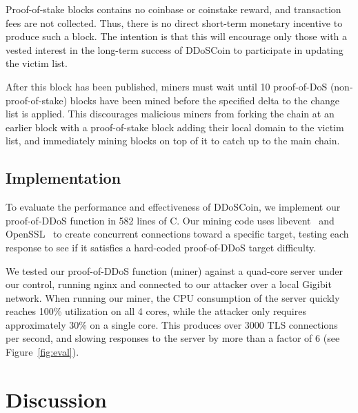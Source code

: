 Proof-of-stake blocks contains no coinbase or coinstake reward, and transaction
fees are not collected. Thus, there is no direct short-term monetary incentive
to produce such a block. The intention is that this will encourage only those
with a vested interest in the long-term success of DDoSCoin to participate in
updating the victim list.

After this block has been published, miners must wait until 10 proof-of-DoS
(non-proof-of-stake) blocks have been mined before the specified delta to the
change list is applied. This discourages malicious miners from forking the chain
at an earlier block with a proof-of-stake block adding their local domain to the
victim list, and immediately mining blocks on top of it to catch up to the main
chain.










\subsection{Implementation}

\FigEval

To evaluate the performance and effectiveness of DDoSCoin, we implement our
proof-of-DDoS function in 582 lines of C. Our mining code uses
libevent~\cite{libevent} and OpenSSL~\cite{openssl} to create concurrent
connections toward a specific target, testing each response to see if it
satisfies a hard-coded proof-of-DDoS target difficulty.

We tested our proof-of-DDoS function (miner) against a quad-core server under
our control, running nginx and connected to our attacker over a local Gigibit
network. When running our miner, the CPU consumption of the server quickly
reaches 100\% utilization on all 4 cores, while the attacker only requires
approximately 30\% on a single core. This produces over 3000 TLS connections per
second, and slowing responses to the server by more than a factor of 6 (see
Figure~\ref{fig:eval}).

\section{Discussion}

